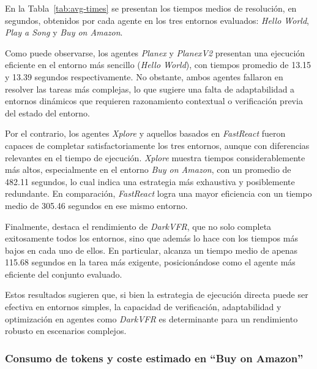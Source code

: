 En la Tabla~\ref{tab:avg-times} se presentan los tiempos medios de resolución,
en segundos, obtenidos por cada agente en los tres entornos evaluados:
\emph{Hello World}, \emph{Play a Song} y \emph{Buy on Amazon}. 

Como puede observarse, los agentes \emph{Planex} y \emph{PlanexV2} presentan
una ejecución eficiente en el entorno más sencillo (\emph{Hello World}), con
tiempos promedio de 13.15 y 13.39 segundos respectivamente. No obstante, ambos
agentes fallaron en resolver las tareas más complejas, lo que sugiere una falta
de adaptabilidad a entornos dinámicos que requieren razonamiento contextual o
verificación previa del estado del entorno.

Por el contrario, los agentes \emph{Xplore} y aquellos basados en \emph{FastReact} 
fueron capaces de completar satisfactoriamente los tres entornos, aunque con
diferencias relevantes en el tiempo de ejecución. \emph{Xplore} muestra
tiempos considerablemente más altos, especialmente en el entorno \emph{Buy on
Amazon}, con un promedio de 482.11 segundos, lo cual indica una estrategia más
exhaustiva y posiblemente redundante. En comparación, \emph{FastReact} logra
una mayor eficiencia con un tiempo medio de 305.46 segundos en ese mismo
entorno.

Finalmente, destaca el rendimiento de \emph{DarkVFR}, que no solo completa
exitosamente todos los entornos, sino que además lo hace con los tiempos más
bajos en cada uno de ellos. En particular, alcanza un tiempo medio de apenas
115.68 segundos en la tarea más exigente, posicionándose como el agente más
eficiente del conjunto evaluado.

Estos resultados sugieren que, si bien la estrategia de ejecución directa puede
ser efectiva en entornos simples, la capacidad de verificación, adaptabilidad y
optimización en agentes como \emph{DarkVFR} es determinante para un
rendimiento robusto en escenarios complejos.


\subsubsection{Consumo de tokens y coste estimado en “Buy on Amazon”}

